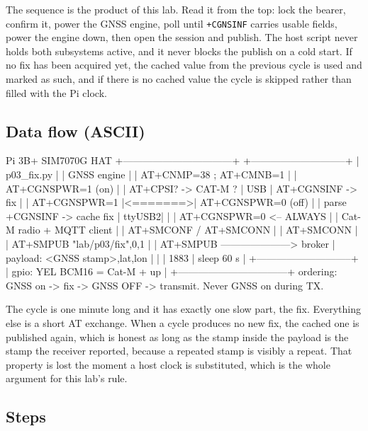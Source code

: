 The sequence is the product of this lab. Read it from the top: lock the bearer, confirm it, power the GNSS engine, poll until \texttt{+CGNSINF} carries usable fields, power the engine down, then open the session and publish. The host script never holds both subsystems active, and it never blocks the publish on a cold start. If no fix has been acquired yet, the cached value from the previous cycle is used and marked as such, and if there is no cached value the cycle is skipped rather than filled with the Pi clock.

\subsection*{Data flow (ASCII)}

\begin{asciiart}
  Pi 3B+                                      SIM7070G HAT
  +---------------------------------+         +-----------------------------+
  | p03_fix.py                      |         | GNSS engine                 |
  |   AT+CNMP=38 ; AT+CMNB=1        |         |   AT+CGNSPWR=1  (on)        |
  |   AT+CPSI?      -> CAT-M ?      |  USB    |   AT+CGNSINF    -> fix      |
  |   AT+CGNSPWR=1                  |<=======>|   AT+CGNSPWR=0  (off)       |
  |   parse +CGNSINF -> cache fix   |  ttyUSB2|                             |
  |   AT+CGNSPWR=0     <-- ALWAYS   |         | Cat-M radio + MQTT client   |
  |   AT+SMCONF / AT+SMCONN         |         |   AT+SMCONN                 |
  |   AT+SMPUB "lab/p03/fix",0,1    |         |   AT+SMPUB ---------------------> broker
  |   payload: <GNSS stamp>,lat,lon |         |                             |    1883
  |   sleep 60 s                    |         +-----------------------------+
  | gpio: YEL BCM16 = Cat-M + up    |
  +---------------------------------+
  ordering:  GNSS on -> fix -> GNSS OFF -> transmit.  Never GNSS on during TX.
\end{asciiart}

The cycle is one minute long and it has exactly one slow part, the fix. Everything else is a short AT exchange. When a cycle produces no new fix, the cached one is published again, which is honest as long as the stamp inside the payload is the stamp the receiver reported, because a repeated stamp is visibly a repeat. That property is lost the moment a host clock is substituted, which is the whole argument for this lab's rule.

\subsection*{Steps}


